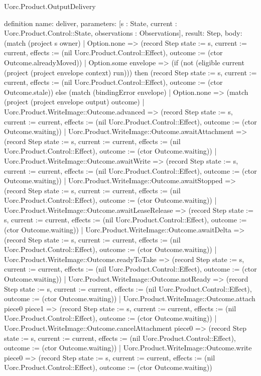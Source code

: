 \begin{lexlean}{Uorc.Product.OutputDelivery}
\begin{semanticmodule}
definition{
  name: deliver,
  parameters: [s : State, current : Uorc.Product.Control::State, observations : Observations],
  result: Step,
  body: (match (project s owner)
    | Option.none => (record Step {state := s, current := current, effects := (nil Uorc.Product.Control::Effect), outcome := (ctor Outcome.alreadyMoved)})
    | Option.some envelope => (if (not (eligible current (project (project envelope context) run))) then (record Step {state := s, current := current, effects := (nil Uorc.Product.Control::Effect), outcome := (ctor Outcome.stale)}) else (match (bindingError envelope)
      | Option.none => (match (project (project envelope output) outcome)
        | Uorc.Product.WriteImage::Outcome.advanced => (record Step {state := s, current := current, effects := (nil Uorc.Product.Control::Effect), outcome := (ctor Outcome.waiting)})
        | Uorc.Product.WriteImage::Outcome.awaitAttachment => (record Step {state := s, current := current, effects := (nil Uorc.Product.Control::Effect), outcome := (ctor Outcome.waiting)})
        | Uorc.Product.WriteImage::Outcome.awaitWrite => (record Step {state := s, current := current, effects := (nil Uorc.Product.Control::Effect), outcome := (ctor Outcome.waiting)})
        | Uorc.Product.WriteImage::Outcome.awaitStopped => (record Step {state := s, current := current, effects := (nil Uorc.Product.Control::Effect), outcome := (ctor Outcome.waiting)})
        | Uorc.Product.WriteImage::Outcome.awaitLeaseRelease => (record Step {state := s, current := current, effects := (nil Uorc.Product.Control::Effect), outcome := (ctor Outcome.waiting)})
        | Uorc.Product.WriteImage::Outcome.awaitDelta => (record Step {state := s, current := current, effects := (nil Uorc.Product.Control::Effect), outcome := (ctor Outcome.waiting)})
        | Uorc.Product.WriteImage::Outcome.readyToTake => (record Step {state := s, current := current, effects := (nil Uorc.Product.Control::Effect), outcome := (ctor Outcome.waiting)})
        | Uorc.Product.WriteImage::Outcome.notReady => (record Step {state := s, current := current, effects := (nil Uorc.Product.Control::Effect), outcome := (ctor Outcome.waiting)})
        | Uorc.Product.WriteImage::Outcome.attach piece0 piece1 => (record Step {state := s, current := current, effects := (nil Uorc.Product.Control::Effect), outcome := (ctor Outcome.waiting)})
        | Uorc.Product.WriteImage::Outcome.cancelAttachment piece0 => (record Step {state := s, current := current, effects := (nil Uorc.Product.Control::Effect), outcome := (ctor Outcome.waiting)})
        | Uorc.Product.WriteImage::Outcome.write piece0 => (record Step {state := s, current := current, effects := (nil Uorc.Product.Control::Effect), outcome := (ctor Outcome.waiting)})
}
\end{semanticmodule}
\end{lexlean}
